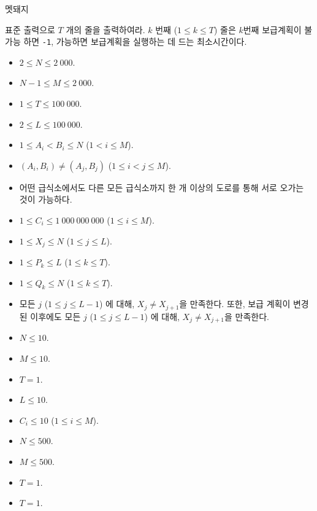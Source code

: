 \begin{problem}{멧돼지}
	\OutputFile
	
	표준 출력으로 $T$ 개의 줄을 출력하여라. $k$ 번째 ($1 \le k \le T$) 줄은 $k$번째 보급계획이 불가능 하면 \texttt{-1}, 가능하면 보급계획을 실행하는 데 드는 최소시간이다.
	
	\Constraints
	
	\begin{itemize}
		\item $2 \le N \le 2\ 000$.
		\item $N-1 \le M \le 2\ 000$.
		\item $1 \le T \le 100\ 000$.
		\item $2 \le L \le 100\ 000$.
		\item $1 \le A_i < B_i \le N$ ($1 < i \le M$).
		\item $(A_i, B_i) \ne (A_j, B_j)$ ($1 \le i< j \le M$).
		\item 어떤 급식소에서도 다른 모든 급식소까지 한 개 이상의 도로를 통해 서로 오가는 것이 가능하다.
		\item $1 \le C_i \le 1\ 000\ 000\ 000$ ($1 \le i \le M$).
		\item $1 \le X_j \le N$ ($1 \le j \le L$).
		\item $1 \le P_k \le L$ ($1 \le k \le T$).
		\item $1 \le Q_k \le N$ ($1 \le k \le T$).
		\item 모든 $j$ ($1 \le j \le L-1$) 에 대해, $X_j \ne X_{j+1}$을 만족한다. 또한, 보급 계획이 변경된 이후에도 모든 $j$ ($1 \le j \le L-1$) 에 대해, $X_j \ne X_{j+1}$을 만족한다.
	\end{itemize}
	
	
	\begin{itemize}
		\item $N \le 10$.
		\item $M \le 10$.
		\item $T = 1$.
		\item $L \le 10$.
		\item $C_i \le 10$ ($1 \le i \le M$).
	\end{itemize}


	\begin{itemize}
		\item $N \le 500$.
		\item $M \le 500$.
		\item $T = 1$.
	\end{itemize}


	\begin{itemize}
		\item $T = 1$.
	\end{itemize}
	

\end{problem}
